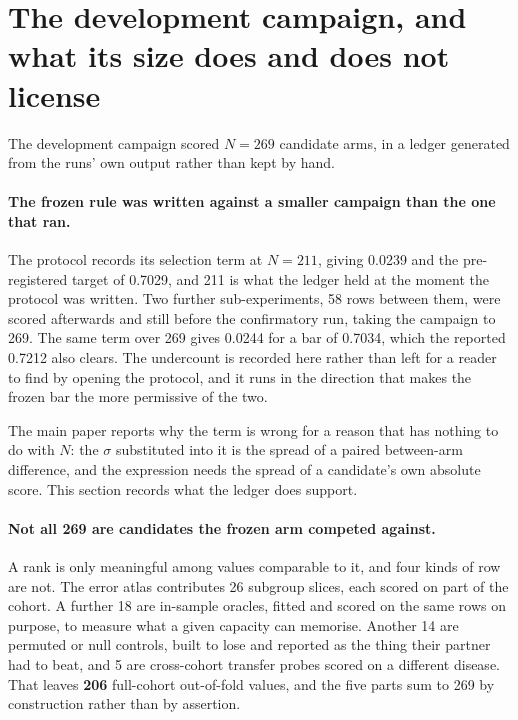 \documentclass[11pt]{article}
\begin{document}
\section{The development campaign, and what its size does and does not license}
\label{sec:campaign}
The development campaign scored $N=269$ candidate arms, in a ledger generated from the runs' own
output rather than kept by hand.

\paragraph{The frozen rule was written against a smaller campaign than the one that ran.} The
protocol records its selection term at $N=211$, giving 0.0239 and the pre-registered target of
0.7029, and 211 is what the ledger held at the moment the protocol was written. Two further
sub-experiments, 58 rows between them, were scored afterwards and still before the confirmatory
run, taking the campaign to 269. The same term over 269 gives 0.0244 for a bar of 0.7034, which the
reported 0.7212 also clears. The undercount is recorded here rather than left for a reader to find
by opening the protocol, and it runs in the direction that makes the frozen bar the more permissive
of the two.

The main paper reports why the term is wrong for a reason that has nothing to do with $N$: the
$\sigma$ substituted into it is the spread of a paired between-arm difference, and the expression
needs the spread of a candidate's own absolute score. This section records what the ledger does
support.

\paragraph{Not all 269 are candidates the frozen arm competed against.} A rank is only meaningful
among values comparable to it, and four kinds of row are not. The error atlas contributes 26
subgroup slices, each scored on part of the cohort. A further 18 are in-sample oracles, fitted and
scored on the same rows on purpose, to measure what a given capacity can memorise. Another 14 are
permuted or null controls, built to lose and reported as the thing their partner had to beat, and 5
are cross-cohort transfer probes scored on a different disease. That leaves \textbf{206}
full-cohort out-of-fold values, and the five parts sum to 269 by construction rather than by
assertion.
\end{document}
